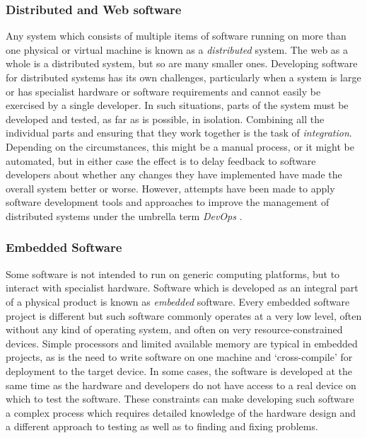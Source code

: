 \subsubsection{Distributed and Web software}

Any system which consists of multiple items of software running on more than one physical or virtual machine is known as a \emph{distributed} system. The web as a whole is a distributed system, but so are many smaller ones. Developing software for distributed systems has its own challenges, particularly when a system is large or has specialist hardware or software requirements and cannot easily be exercised by a single developer. In such situations, parts of the system must be developed and tested, as far as is possible, in isolation. Combining all the individual parts and ensuring that they work together is the task of \emph{integration}. Depending on the circumstances, this might be a manual process, or it might be automated, but in either case the effect is to delay feedback to software developers about whether any changes they have implemented have made the overall system better or worse. However, attempts have been made to apply software development tools and approaches to improve the management of distributed systems under the umbrella term \emph{DevOps} \citep{Jabbari2016}.

\subsubsection{Embedded Software}

Some software is not intended to run on generic computing platforms, but to interact with specialist hardware. Software which is developed as an integral part of a physical product is known as \emph{embedded} software. Every embedded software project is different but such software commonly operates at a very low level, often without any kind of operating system, and often on very resource-constrained devices. Simple processors and limited available memory are typical in embedded projects, as is the need to write software on one machine and `cross-compile' for deployment to the target device. In some cases, the software is developed at the same time as the hardware and developers do not have access to a real device on which to test the software. These constraints can make developing such software a complex process which requires detailed knowledge of the hardware design and a different approach to testing as well as to finding and fixing problems.

